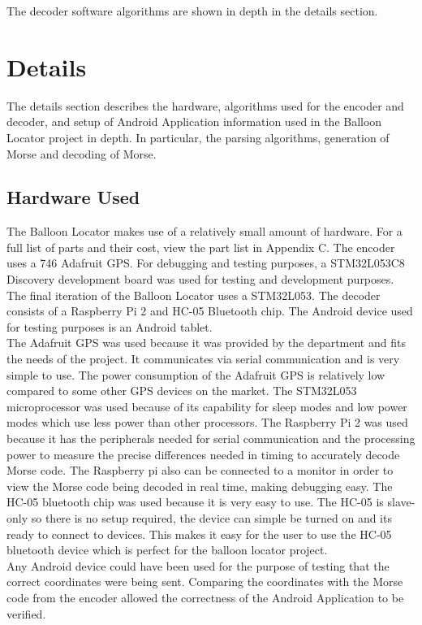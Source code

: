 \documentclass[12pt, letterpaper]{article}
\begin{document}
The decoder software algorithms are shown in depth in the details section.

\section{Details}
The details section describes the hardware, algorithms used for the encoder and decoder, and setup of Android Application information used in the Balloon Locator project in depth. In particular, the parsing algorithms, generation of Morse and decoding of Morse. 

\subsection{Hardware Used}
The Balloon Locator makes use of a relatively small amount of hardware. For a full list of parts and their cost, view the part list in Appendix C. The encoder uses a 746 Adafruit GPS. For debugging and testing purposes, a STM32L053C8 Discovery development board was used for testing and development purposes. The final iteration of the Balloon Locator uses a STM32L053. The decoder consists of a Raspberry Pi 2 and HC-05 Bluetooth chip. The Android device used for testing purposes is an Android tablet.\\

The Adafruit GPS was used because it was provided by the department and fits the needs of the project. It communicates via serial communication and is very simple to use. The power consumption of the Adafruit GPS is relatively low compared to some other GPS devices on the market. The STM32L053 microprocessor was used because of its capability for sleep modes and low power modes which use less power than other processors. The Raspberry Pi 2 was used because it has the peripherals needed for serial communication and the processing power to measure the precise differences needed in timing to accurately decode Morse code. The Raspberry pi also can be connected to a monitor in order to view the Morse code being decoded in real time, making debugging easy. The HC-05 bluetooth chip was used because it is very easy to use. The HC-05 is slave-only so there is no setup required, the device can simple be turned on and its ready to connect to devices. This makes it easy for the user to use the HC-05 bluetooth device which is perfect for the balloon locator project.\\

Any Android device could have been used for the purpose of testing that the correct coordinates were being sent. Comparing the coordinates with the Morse code from the encoder allowed the correctness of the Android Application to be verified.\\
\end{document}
